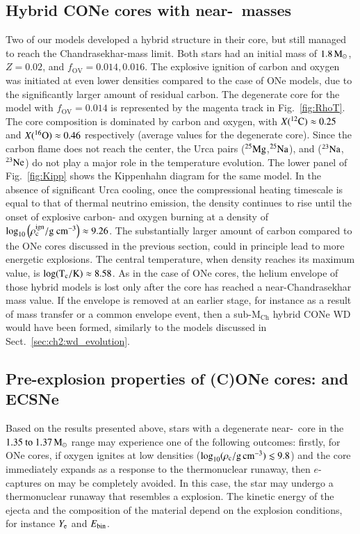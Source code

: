 \documentclass[main.tex]{subfiles}
\begin{document}
\newpage
\subsection{Hybrid CONe cores with near-\mch\ masses}\label{sec:ch2:cone_core_evolution}
Two of our \seriesone models developed a hybrid 
structure in their core, but still managed to reach 
the Chandrasekhar-mass limit. Both stars had an 
initial mass of $1.8\msun$,  $Z = 0.02$, and 
$f_\text{OV} = 0.014, 0.016$. The explosive 
ignition of carbon and oxygen was initiated at even
lower densities  compared to the case of 
ONe models, due to the significantly larger amount
of residual carbon. The degenerate core for the model with $f_{\text{OV}} = 0.014$
is represented by the magenta track in Fig.~\ref{fig:RhoT}. The core composition is dominated by  carbon and oxygen, 
with $X(\iso{C}{12}) \approx 0.25$ and 
$X(\iso{O}{16}) \approx 0.46$ respectively (average values for the degenerate core). Since the carbon flame does not reach the center, the Urca pairs ($\rm ^{25}Mg$,$\rm ^{25}Na$), and ($\rm ^{23}Na$,$\rm ^{23}Ne$) do not play a major role in the temperature evolution. 
The lower panel of Fig.~\ref{fig:Kipp} shows the Kippenhahn diagram for 
the same model. In the absence of significant Urca cooling, once the 
compressional heating timescale is equal to that  of thermal neutrino 
emission, the density continues to rise until the onset of explosive 
carbon- and oxygen burning at a density of $\rm \log_{10} 
\left(\rho_c^{\rm ign} / \rm g \ cm^{-3} \right) \approx 9.26$. The 
substantially larger amount of carbon compared to the 
ONe cores discussed in the previous section, could in principle lead to more energetic 
explosions. The central temperature, when density reaches its maximum 
value, is $\rm \log(T_c / \rm K) \approx 8.58$.
As in the case of ONe cores, the helium envelope of those hybrid models 
is lost only after the core has reached a near-Chandrasekhar mass value. 
If the envelope is removed at an earlier stage, for instance as a result of mass transfer or a common envelope event, then a sub-M$_{\text{Ch}}$ 
hybrid CONe WD would have been formed, similarly to the models   
discussed in Sect.~\ref{sec:ch2:wd_evolution}.

\newpage
\subsection{Pre-explosion properties of (C)ONe cores: \ias and ECSNe}\label{sec:ch2:explosion_properties} 
Based on the results presented  above, stars with a degenerate near-\mch\ core in the $\numrange{1.35}{1.37}\msun$ range may experience one of the following outcomes: firstly, for ONe cores, if oxygen ignites at low densities ($\logrhoc \lesssim 9.8$) and the core immediately expands as a response to the thermonuclear runaway, then $e$-captures on  may be completely avoided. In this case, the star may  undergo a thermonuclear runaway that resembles a \ia explosion. The kinetic energy of the ejecta and the composition of the material  depend on the explosion conditions, for instance $Y_{\rm e}$ and $E_{\rm bin}$.
\end{document}
